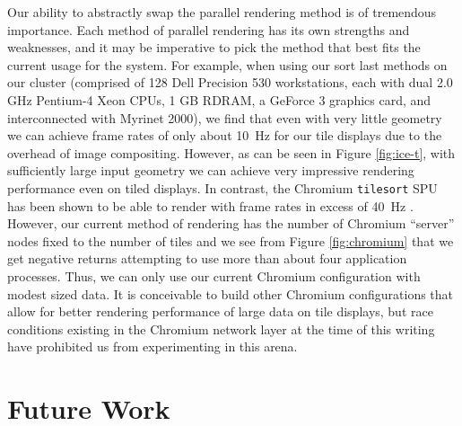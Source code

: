 \documentclass{acmsiggraph}
\newcommand{\sticky}[1]{}
\newcommand{\cidentifier}[1]{\texttt{#1}}
\begin{document}

  Our ability to abstractly swap the parallel rendering method is of
  tremendous importance.  Each method of parallel rendering has its own
  strengths and weaknesses, and it may be imperative to pick the method
  that best fits the current usage for the system.  For example, when using
  our sort last methods on our cluster (comprised of 128 Dell Precision 530
  workstations, each with dual 2.0 GHz Pentium-4 Xeon CPUs, 1 GB RDRAM, a
  GeForce 3 graphics card, and interconnected with Myrinet 2000), we find
  that even with very little geometry we can achieve frame rates of only
  about 10~Hz for our tile displays due to the overhead of image
  compositing.  However, as can be seen in Figure \ref{fig:ice-t}, with
  sufficiently large input geometry we can achieve very impressive
  rendering performance even on tiled displays.  In contrast, the Chromium
  \cidentifier{tile\-sort} SPU has been shown to be able to render with
  frame rates in excess of 40~Hz \cite{Humphreys02}.  However, our current
  method of rendering has the number of Chromium ``server'' nodes fixed to
  the number of tiles and we see from Figure \ref{fig:chromium} that we get
  negative returns attempting to use more than about four application
  processes.  Thus, we can only use our current Chromium configuration with
  modest sized data.  It is conceivable to build other Chromium
  configurations that allow for better rendering performance of large data
  on tile displays, but race conditions existing in the Chromium network
  layer at the time of this writing have prohibited us from experimenting
  in this arena.



  \section{Future Work}
  \label{sec:future_work}
\end{document}
